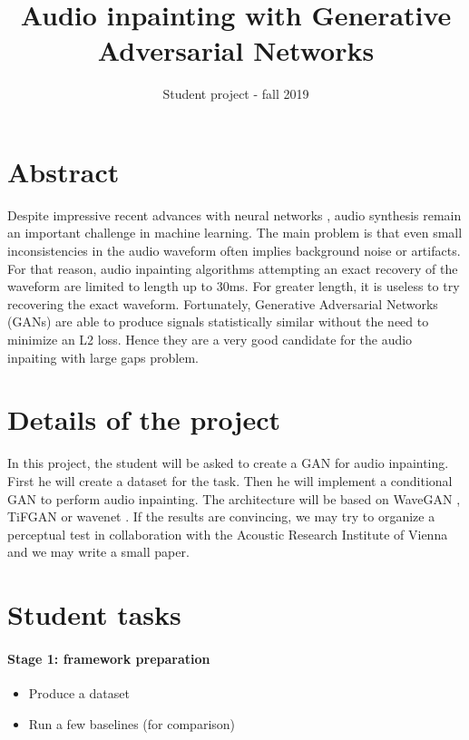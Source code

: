 \documentclass[a4paper]{article}
\title{Audio inpainting with Generative Adversarial Networks}
\date{Student project - fall 2019}
\begin{document}
\maketitle

\section{Abstract}
Despite impressive recent advances with neural networks \cite{van2016wavenet,donahue2018wavegan}, audio synthesis remain an important challenge in machine learning. The main problem is that even small inconsistencies in the audio waveform often implies background noise or artifacts. 
For that reason, audio inpainting algorithms attempting an exact recovery of the waveform are limited to length up to 30ms.
For greater length, it is useless to try recovering the exact waveform. Fortunately, Generative Adversarial Networks (GANs) are able to produce signals statistically similar without the need to minimize an L2 loss. Hence they are a very good candidate for the audio inpaiting with large gaps problem.



\section{Details of the project}
In this project, the student will be asked to create a GAN for audio inpainting. First he will create a dataset for the task. Then he will implement a conditional GAN to perform audio inpainting.
The architecture will be based on WaveGAN \cite{donahue2018wavegan}, TiFGAN \cite{marafioti2019adversarial} or wavenet \cite{van2016wavenet}.
If the results are convincing, we may try to organize a perceptual test in collaboration with the Acoustic Research Institute of Vienna and we may write a small paper.


\section{Student tasks}
\paragraph{Stage 1: framework preparation} 
\begin{itemize}
	\item Produce a dataset
	\item Run a few baselines (for comparison)
\end{itemize}
\end{document}

